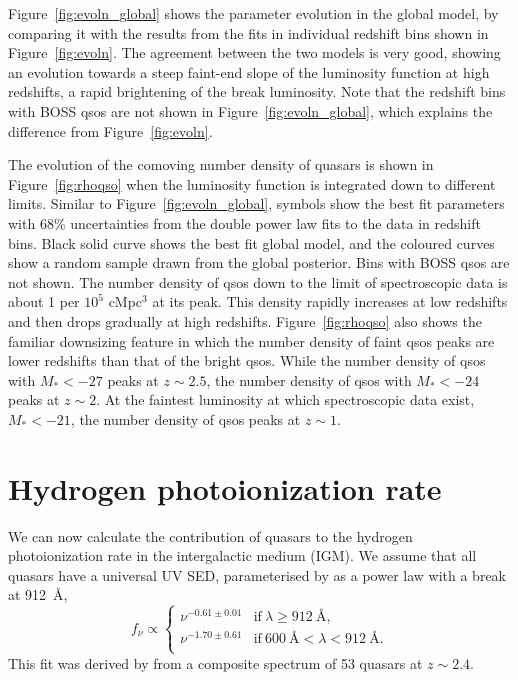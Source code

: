 \documentclass[a4paper,fleqn,usenatbib]{mnras}
\begin{document}
Figure~\ref{fig:evoln_global} shows the parameter evolution in the
global model, by comparing it with the results from the fits in
individual redshift bins shown in Figure~\ref{fig:evoln}.  The
agreement between the two models is very good, showing an evolution
towards a steep faint-end slope of the luminosity function at high
redshifts, a rapid brightening of the break luminosity.  Note that the
redshift bins with BOSS qsos are not shown in
Figure~\ref{fig:evoln_global}, which explains the difference from
Figure~\ref{fig:evoln}.

The evolution of the comoving number density of quasars is shown in
Figure~\ref{fig:rhoqso} when the luminosity function is integrated
down to different limits.  Similar to Figure~\ref{fig:evoln_global},
symbols show the best fit parameters with 68\% uncertainties from the
double power law fits to the data in redshift bins.  Black solid curve
shows the best fit global model, and the coloured curves show a random
sample drawn from the global posterior.  Bins with BOSS qsos are not
shown.  The number density of qsos down to the limit of spectroscopic
data is about 1 per $10^5$ cMpc$^3$ at its peak.  This density rapidly
increases at low redshifts and then drops gradually at high redshifts.
Figure~\ref{fig:rhoqso} also shows the familiar downsizing feature in
which the number density of faint qsos peaks are lower redshifts than
that of the bright qsos.  While the number density of qsos with
$M_*<-27$ peaks at $z\sim 2.5$, the number density of qsos with
$M_*<-24$ peaks at $z\sim 2$.  At the faintest luminosity at which
spectroscopic data exist, $M_*<-21$, the number density of qsos peaks
at $z\sim 1$.


\section{Hydrogen photoionization rate}

We can now calculate the contribution of quasars to the hydrogen
photoionization rate in the intergalactic medium (IGM).  We assume
that all quasars have a universal UV SED, parameterised by
\citet{2015MNRAS.449.4204L} as a power law with a break at 912~{\AA},
\begin{equation}
f_\nu\propto\begin{cases}
               \nu^{-0.61\pm 0.01} & \text{if}~\lambda\geq 912~\text{\AA},\\
               \nu^{-1.70\pm 0.61} & \text{if}~600~\text{\AA}<\lambda<912~\text{\AA}.\\                
               \end{cases}
\label{eqn:sed}
\end{equation}
This fit was derived by \citet{2015MNRAS.449.4204L} from a composite
spectrum of 53 quasars at $z\sim 2.4$.
\end{document}
